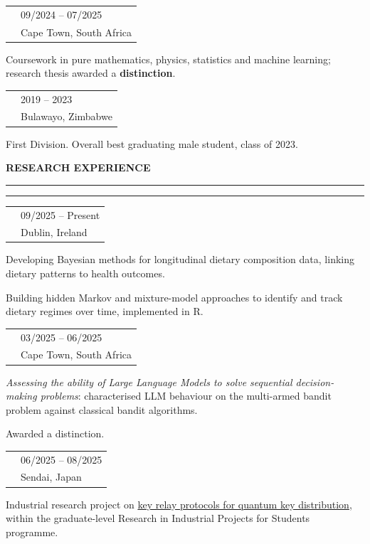 \documentclass[a4paper,10pt]{article}
\makeatletter
\newcommand{\cvsection}[1]{%
  \par\penalty-180\vspace{0.95em}%
  {\bfseries\fontsize{11.5}{12}\selectfont\color{cvblue}\MakeUppercase{#1}}%
  \par\nobreak\nointerlineskip\vspace{0.52em}%
  \noindent\textcolor{cvlime}{\rule{2.4em}{1.6pt}}%
  \textcolor{cvmist}{\rule{\dimexpr\textwidth-2.4em\relax}{1.6pt}}%
  \par\nobreak\nointerlineskip\vspace{0.42em}\nobreak%
}
\newcommand{\cventry}[4]{%
  \par\vspace{0.42em}\nointerlineskip
  \noindent\begin{tabularx}{\textwidth}{@{}>{\raggedright\arraybackslash}X@{\hspace{1em}}>{\raggedleft\arraybackslash}p{0.30\textwidth}@{}}
    {\bfseries\color{cvnavy}#1} & {\small\color{cvslate}#3}\\
    {\small\itshape\color{cvblue}#2} & {\small\color{cvslate}#4}\\
  \end{tabularx}%
  \par\nointerlineskip\vspace{0.10em}\nopagebreak%
}
\makeatother
\begin{document}
\cventry{MSc in Mathematical Sciences}{AIMS South Africa \& Stellenbosch University}{09/2024 -- 07/2025}{Cape Town, South Africa}
\begin{cvitems}
  \item Coursework in pure mathematics, physics, statistics and machine learning; research thesis awarded a \textbf{distinction}.
\end{cvitems}

\cventry{BSc Honours in Operations Research and Statistics}{National University of Science and Technology (NUST)}{2019 -- 2023}{Bulawayo, Zimbabwe}
\begin{cvitems}
  \item First Division. Overall best graduating male student, class of 2023.
\end{cvitems}

\cvsection{Research Experience}

\cventry{Doctoral Researcher --- T-DIET}{Trinity College Dublin}{09/2025 -- Present}{Dublin, Ireland}
\begin{cvitems}
  \item Developing Bayesian methods for longitudinal dietary composition data, linking dietary patterns to health outcomes.
  \item Building hidden Markov and mixture-model approaches to identify and track dietary regimes over time, implemented in R.
\end{cvitems}

\cventry{MSc Research Project}{AIMS South Africa --- Supervisor: Prof.\ Audrey Durand (Universit\'e Laval, Canada)}{03/2025 -- 06/2025}{Cape Town, South Africa}
\begin{cvitems}
  \item \emph{Assessing the ability of Large Language Models to solve sequential decision-making problems}: characterised LLM behaviour on the multi-armed bandit problem against classical bandit algorithms.
  \item Awarded a distinction.
\end{cvitems}

\cventry{Research Participant --- g-RIPS-Sendai}{AIMR, Tohoku University (with IPAM, UCLA)}{06/2025 -- 08/2025}{Sendai, Japan}
\begin{cvitems}
  \item Industrial research project on \href{https://www.mccs.tohoku.ac.jp/g-rips/report/2025/pdf/Mitsubishi\%20B_final_report.pdf}{key relay protocols for quantum key distribution}, within the graduate-level Research in Industrial Projects for Students programme.
\end{cvitems}
\end{document}
